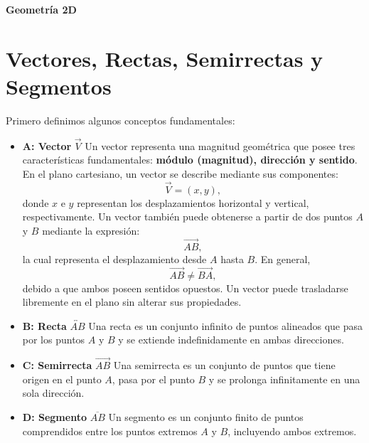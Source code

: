 \documentclass{article}
\begin{document}
\begin{center}
    {\huge\textbf{Geometría 2D}}
\end{center}
\section*{Vectores, Rectas, Semirrectas y Segmentos}
Primero definimos algunos conceptos fundamentales:
\begin{itemize}
    \item \textbf{A: Vector} $\vec{V}$
    Un vector representa una magnitud geométrica que posee tres características fundamentales: \textbf{módulo (magnitud), dirección y sentido}. En el plano cartesiano, un vector se describe mediante sus componentes:
    \[\vec{V}=(x,y),\]
    donde $x$ e $y$ representan los desplazamientos horizontal y vertical, respectivamente.
    Un vector también puede obtenerse a partir de dos puntos $A$ y $B$ mediante la expresión:
    \[\overrightarrow{AB},\]
    la cual representa el desplazamiento desde $A$ hasta $B$. En general,
    \[\overrightarrow{AB}\neq\overrightarrow{BA},\]
    debido a que ambos poseen sentidos opuestos. Un vector puede trasladarse libremente en el plano sin alterar sus propiedades.
    \item \textbf{B: Recta} $\overleftrightarrow{AB}$
    Una recta es un conjunto infinito de puntos alineados que pasa por los puntos $A$ y $B$ y se extiende indefinidamente en ambas direcciones.
    \item \textbf{C: Semirrecta} $\overrightarrow{AB}$
    Una semirrecta es un conjunto de puntos que tiene origen en el punto $A$, pasa por el punto $B$ y se prolonga infinitamente en una sola dirección.
    \item \textbf{D: Segmento} $\overline{AB}$
    Un segmento es un conjunto finito de puntos comprendidos entre los puntos extremos $A$ y $B$, incluyendo ambos extremos.
\end{itemize}
\begin{center}
\end{center}
\end{document}
